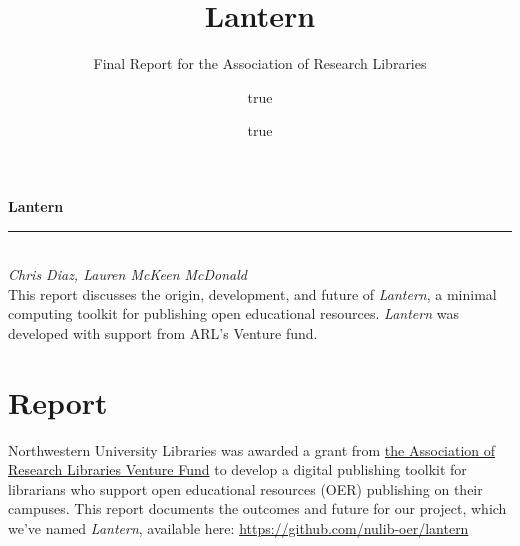 \documentclass[
  11pt,
  openany]{book}
\title{Lantern}
\subtitle{Final Report for the Association of Research Libraries}
\author{true \and true}
\date{}
\begin{document}
\frontmatter

\begin{titlepage}
\begin{flushleft}

\textbf{\fontsize{48}{54}\selectfont Lantern \\}
{\color{gray}{\large Final Report for the Association of Research Libraries}}

\par\noindent\rule{1in}{2pt}\\


\textit{Chris Diaz, Lauren McKeen McDonald}\\

\vspace{1in}
This report discusses the origin, development, and future of \emph{Lantern}, a
minimal computing toolkit for publishing open educational resources.
\emph{Lantern} was developed with support from ARL's Venture fund.

\end{flushleft}

  
\end{titlepage}
\restoregeometry





\mainmatter

\hypertarget{report}{%
\chapter{Report}\label{report}}

Northwestern University Libraries was awarded a grant from
\href{https://www.arl.org/news/arl-launches-venture-fund-to-support-research-and-development-in-member-libraries-proposals-due-february-28/}{the
Association of Research Libraries Venture Fund} to develop a digital
publishing toolkit for librarians who support open educational resources (OER)
publishing on their campuses. This report documents the outcomes and future
for our project, which we've named \emph{Lantern}, available here:
\url{https://github.com/nulib-oer/lantern}
\end{document}
